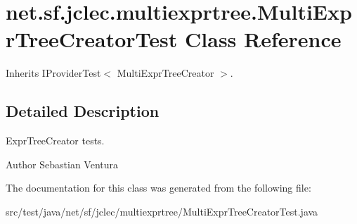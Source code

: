 \hypertarget{classnet_1_1sf_1_1jclec_1_1multiexprtree_1_1_multi_expr_tree_creator_test}{\section{net.\-sf.\-jclec.\-multiexprtree.\-Multi\-Expr\-Tree\-Creator\-Test Class Reference}
\label{classnet_1_1sf_1_1jclec_1_1multiexprtree_1_1_multi_expr_tree_creator_test}
}


Inherits I\-Provider\-Test$<$ Multi\-Expr\-Tree\-Creator $>$.



\subsection{Detailed Description}
Expr\-Tree\-Creator tests.

\begin{DoxyAuthor}{Author}
Sebastian Ventura 
\end{DoxyAuthor}


The documentation for this class was generated from the following file\-:\begin{DoxyCompactItemize}
\item 
src/test/java/net/sf/jclec/multiexprtree/Multi\-Expr\-Tree\-Creator\-Test.\-java\end{DoxyCompactItemize}
